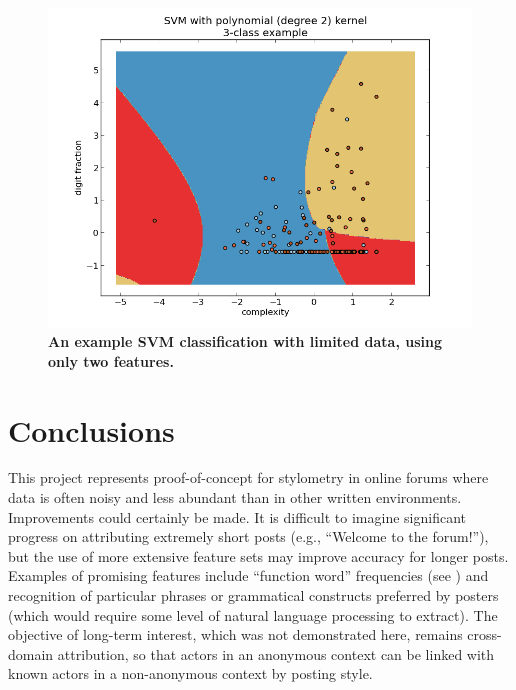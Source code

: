 \documentclass[12pt,letterpaper,onecolumn,oneside]{article}
\numberwithin{equation}{section}
\numberwithin{figure}{section}
\begin{document}
\begin{figure}[H]
 \centering
  \includegraphics[scale=0.4]{SVMpic.png}
  \caption{\textbf{\footnotesize{An example SVM classification with limited data, using only two features.}}}
  \label{SVM_pic}
\end{figure}

\section{Conclusions}
This project represents proof-of-concept for stylometry in online forums where data is often noisy and less abundant than in other written environments. Improvements could certainly be made. It is difficult to 
imagine significant progress on attributing extremely short posts (e.g., ``Welcome to the forum!''), but the use of more extensive feature sets may improve accuracy for longer posts. Examples of promising features 
include ``function word'' frequencies (see \cite{stanford}) and recognition of particular phrases or grammatical constructs preferred by posters (which would require some level of natural language processing to 
extract). The objective of long-term interest, which was not demonstrated here, remains cross-domain attribution, so that actors in an anonymous context can be linked with known actors in a non-anonymous context by 
posting style.
\end{document}
